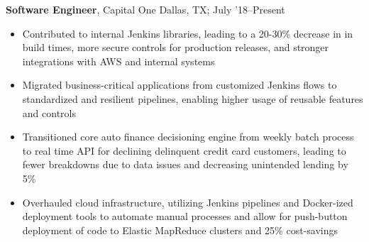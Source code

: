 \documentclass[11pt]{article}
\begin{document}
\textbf{Software Engineer}, Capital One \hfill Dallas, TX; July '18--Present
\begin{itemize}
  \item Contributed to internal Jenkins libraries, leading to a 20-30\% decrease in
        in build times, more secure controls for production releases, and stronger
        integrations with AWS and internal systems
  \item Migrated business-critical applications from customized Jenkins flows
        to standardized and resilient pipelines, enabling higher usage of reusable
        features and controls
  \item Transitioned core auto finance decisioning engine from weekly batch
        process to real time API for declining delinquent credit card customers,
        leading to fewer breakdowns due to data issues and decreasing unintended
        lending by 5\%
  \item Overhauled cloud infrastructure, utilizing Jenkins pipelines and
        Docker-ized deployment tools to automate manual processes and allow for
        push-button deployment of code to Elastic MapReduce clusters and 25\% cost-savings
\end{itemize}
\end{document}
